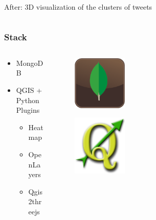 \documentclass[hyperref={pdfpagelabels=true}]{beamer}
\begin{document}
\begin{frame}
\begin{columns}
\begin{column}{0.5\textwidth}
\begin{figure}
       \end{figure}  
    \tiny{After: 3D visualization of the clusters of tweets}  
  \end{column}  
\end{columns}
\end{frame}

\begin{frame}
\frametitle{Stack}

\begin{columns}
  \begin{column}{0.5\textwidth}
\begin{itemize}
  \item MongoDB
  \item QGIS + Python Plugins
  \begin{itemize}
    \item<2-> Heatmap
    \item<3-> OpenLayers
    \item<4-> Qgis2threejs    
  \end{itemize}    
\end{itemize}
  \end{column}
  \begin{column}{0.5\textwidth}
      \begin{figure}  
	\includegraphics[width=0.3\textwidth]{mongodb_logo.png}\\
       \end{figure}  
      \begin{figure}  
	\includegraphics[width=0.3\textwidth]{qgis_logo.jpg}\\
       \end{figure}         
  \end{column}  
\end{columns}



\end{frame}
\end{document}
